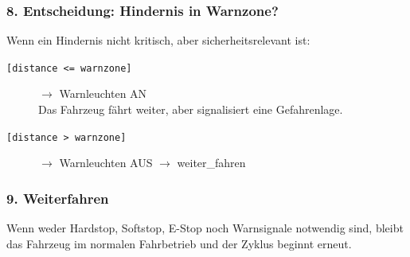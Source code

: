 \subsubsection*{8. Entscheidung: Hindernis in Warnzone?}

\quad Wenn ein Hindernis nicht kritisch, aber sicherheitsrelevant ist:

\begin{description}
    \item[\texttt{[distance <= warnzone]}] $\rightarrow$ Warnleuchten AN\\
    \quad Das Fahrzeug fährt weiter, aber signalisiert eine Gefahrenlage.
    \item[\texttt{[distance > warnzone]}] $\rightarrow$ Warnleuchten AUS $\rightarrow$ weiter\_fahren
\end{description}

\subsubsection*{9. Weiterfahren}

\quad Wenn weder \ac{Hardstop}, \ac{Softstop}, \ac{E-Stop} noch Warnsignale notwendig sind, 
bleibt das Fahrzeug im normalen Fahrbetrieb und der Zyklus beginnt erneut.
